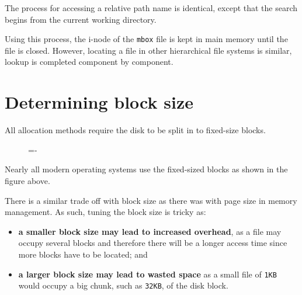 \documentclass[a4paper]{systems-software}
\begin{document}
The process for accessing a relative path name is identical, except that the search begins from the current working directory.

Using this process, the i-node of the \texttt{mbox} file is kept in main memory until the file is closed. However, locating a file in other hierarchical file systems is similar, lookup is completed component by component.


\newpage

\section{Determining block size}

All allocation methods require the disk to be split in to fixed-size blocks.

\begin{figure}[H]
  \lineskip=-\fboxrule
\end{figure}

Nearly all modern operating systems use the fixed-sized blocks as shown in the figure above.

There is a similar trade off with block size as there was with page size in memory management. As such, tuning the block size is tricky as:
\begin{itemize}
	\item \textbf{a smaller block size may lead to increased overhead}, as a file may occupy several blocks and therefore there will be a longer access time since more blocks have to be located; and 
	\item \textbf{a larger block size may lead to wasted space} as a small file of \texttt{1KB} would occupy a big chunk, such as \texttt{32KB}, of the disk block.
\end{itemize}
\end{document}

